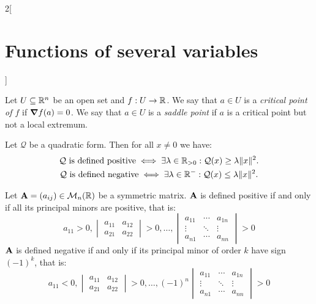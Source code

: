 \documentclass[../../../main.tex]{subfiles}
\begin{document}
\begin{multicols}{2}[\section{Functions of several variables}]
\begin{prop}
    \end{prop}
    \begin{definition}
        Let $U\subseteq\mathbb{R}^n$ be an open set and $f:U\rightarrow\mathbb{R} $. We say that $a\in U$ is a \textit{critical point of $f$} if $\grad f(a)=0$. We say that $a\in U$ is a \textit{saddle point} if $a$ is a critical point but not a local extremum.
    \end{definition}
    \begin{theorem}
        Let $\mathcal{Q}$ be a quadratic form. Then for all $x\ne 0$ we have:
        \begin{gather*}
            \mathcal{Q}\text{ is defined positive}\iff\exists\lambda\in\mathbb{R}_{>0}:\mathcal{Q}(x)\geq\lambda\|x\|^2.\\
            \mathcal{Q}\text{ is defined negative}\iff\exists\lambda\in\mathbb{R}^-:\mathcal{Q}(x)\leq\lambda\|x\|^2.
        \end{gather*}
    \end{theorem}
    \begin{prop}
        Let $\boldsymbol{\mathrm{A}}=(a_{ij})\in\mathcal{M}_n(\mathbb{R} )$ be a symmetric matrix. $\boldsymbol{\mathrm{A}}$ is defined positive if and only if all its principal minors are positive, that is:
        $$a_{11}>0,
            \begin{vmatrix}
                a_{11} & a_{12} \\
                a_{21} & a_{22}\end{vmatrix}>0,\ldots,
            \begin{vmatrix}
                a_{11} & \cdots & a_{1n} \\
                \vdots & \ddots & \vdots \\
                a_{n1} & \cdots & a_{nn}
            \end{vmatrix}>0$$
        $\boldsymbol{\mathrm{A}}$ is defined negative if and only if its principal minor of order $k$ have sign $(-1)^k$, that is:
        $$a_{11}<0,
            \begin{vmatrix}
                a_{11} & a_{12} \\
                a_{21} & a_{22}
            \end{vmatrix}>0,\ldots,
            (-1)^n\begin{vmatrix}
                a_{11} & \cdots & a_{1n} \\
                \vdots & \ddots & \vdots \\
                a_{n1} & \cdots & a_{nn}
            \end{vmatrix}>0$$

\end{prop}
\end{multicols}
\end{document}
